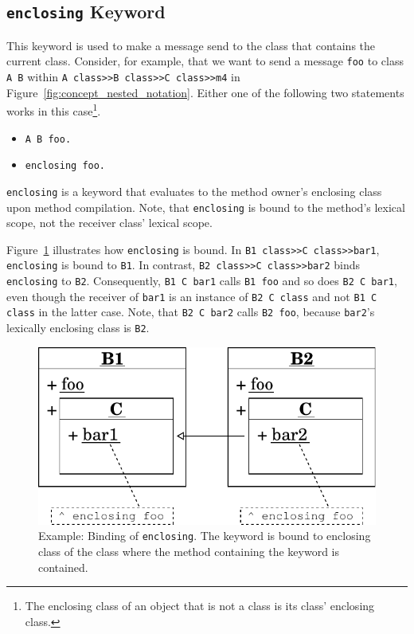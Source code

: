 \subsection{\texttt{enclosing} Keyword}
This keyword is used to make a message send to the class that contains the current class. Consider, for example, that we want to send a message \texttt{foo} to class \texttt{A B} within \texttt{A class>>B class>>C class>>m4} in Figure~\ref{fig:concept_nested_notation}. Either one of the following two statements works in this case\footnote{The enclosing class of an object that is not a class is its class' enclosing class.}.

\begin{itemize}
	\item \texttt{A B foo.}
	\item \texttt{enclosing foo.}
\end{itemize}

\texttt{enclosing} is a keyword that evaluates to the method owner's enclosing class upon method compilation. Note, that \texttt{enclosing} is bound to the method's lexical scope, not the receiver class' lexical scope.

Figure~\ref{fig:concept_lexical_thisouter} illustrates how \texttt{enclosing} is bound. In \texttt{B1 class>>C class>>bar1}, \texttt{enclosing} is bound to \texttt{B1}. In contrast, \texttt{B2 class>>C class>>bar2} binds \texttt{enclosing} to \texttt{B2}. Consequently, \texttt{B1 C bar1} calls \texttt{B1 foo} and so does \texttt{B2 C bar1}, even though the receiver of \texttt{bar1} is an instance of \texttt{B2 C class} and not \texttt{B1 C class} in the latter case. Note, that \texttt{B2 C bar2} calls \texttt{B2 foo}, because \texttt{bar2}'s lexically enclosing class is \texttt{B2}.

\begin{figure}[!htp]
	\includegraphics[scale=0.75]{nested_lexical1.pdf}
	\centering
	\caption[Example: Binding of \texttt{enclosing}]{Example: Binding of \texttt{enclosing}. The keyword is bound to enclosing class of the class where the method containing the keyword is contained.}
	\label{fig:concept_lexical_thisouter}
\end{figure}

